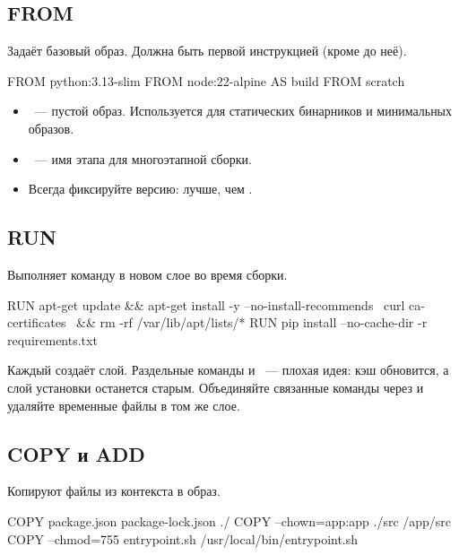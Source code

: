 \subsection{FROM}

Задаёт базовый образ. Должна быть первой инструкцией (кроме 
до неё).

\begin{code}[language=dockerfile]
FROM python:3.13-slim
FROM node:22-alpine AS build
FROM scratch
\end{code}

\begin{itemize}
  \item {}~--- пустой образ. Используется для статических
        бинарников и минимальных образов.
  \item {}~--- имя этапа для многоэтапной сборки.
  \item Всегда фиксируйте версию:  лучше, чем
        .
\end{itemize}

\subsection{RUN}

Выполняет команду в новом слое во время сборки.

\begin{code}[language=dockerfile]
RUN apt-get update && apt-get install -y --no-install-recommends \
      curl ca-certificates \
    && rm -rf /var/lib/apt/lists/*
RUN pip install --no-cache-dir -r requirements.txt
\end{code}

\begin{warnbox}
Каждый  создаёт слой. Раздельные команды
 и ~--- плохая идея:
кэш обновится, а слой установки останется старым. Объединяйте связанные
команды через \cmd{\&\&} и удаляйте временные файлы в том же слое.
\end{warnbox}

\subsection{COPY и ADD}

Копируют файлы из контекста в образ.

\begin{code}[language=dockerfile]
COPY package.json package-lock.json ./
COPY --chown=app:app ./src /app/src
COPY --chmod=755 entrypoint.sh /usr/local/bin/entrypoint.sh
\end{code}

